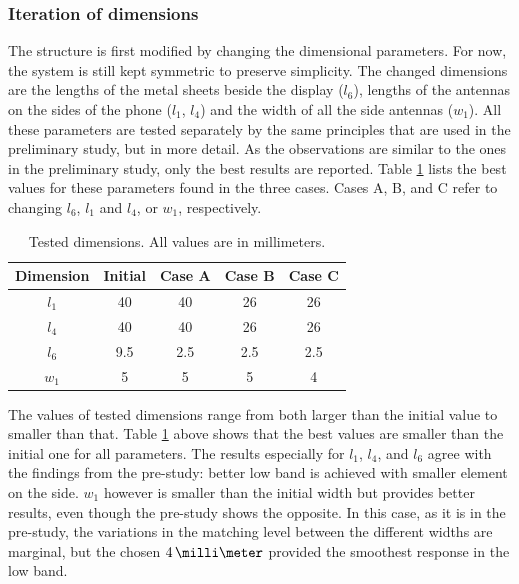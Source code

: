 \subsubsection{Iteration of dimensions}
\label{sec:dimension iteration}
The structure is first modified by changing the dimensional parameters. For now, the system is still kept symmetric to preserve simplicity. The changed dimensions are the lengths of the metal sheets beside the display ($l_6$), lengths of the antennas on the sides of the phone ($l_1$, $l_4$) and the width of all the side antennas ($w_1$). All these parameters are tested separately by the same principles that are used in the preliminary study, but in more detail. As the observations are similar to the ones in the preliminary study, only the best results are reported. Table \ref{tab:concept2} lists the best values for these parameters found in the three cases. Cases A, B, and C refer to changing $l_6$, $l_1$ and $l_4$, or $w_1$, respectively. 
\begin{table}[H]
    \centering
    \caption{Tested dimensions. All values are in millimeters.}
    \label{tab:concept2}
    \begin{tabular}{|c|c|c|c|c|}
        \hline
        \textbf{Dimension} & \textbf{Initial} & \textbf{Case A} & \textbf{Case B} & \textbf{Case C}\\
        \hline
        $l_1$ & 40 & 40 & 26 & 26\\
        \hline
        $l_4$ & 40 & 40 & 26 & 26\\
        \hline
        $l_6$ & 9.5 & 2.5 & 2.5 & 2.5\\
        \hline
        $w_1$ & 5 & 5 & 5 & 4\\
        \hline
    \end{tabular}
\end{table}

The values of tested dimensions range from both larger than the initial value to smaller than that. Table \ref{tab:concept2} above shows that the best values are smaller than the initial one for all parameters. The results especially for $l_1$, $l_4$, and $l_6$ agree with the findings from the pre-study: better low band is achieved with smaller element on the side. $w_1$ however is smaller than the initial width but provides better results, even though the pre-study shows the opposite. In this case, as it is in the pre-study, the variations in the matching level between the different widths are marginal, but the chosen $4\,\milli\meter$ provided the smoothest response in the low band.

